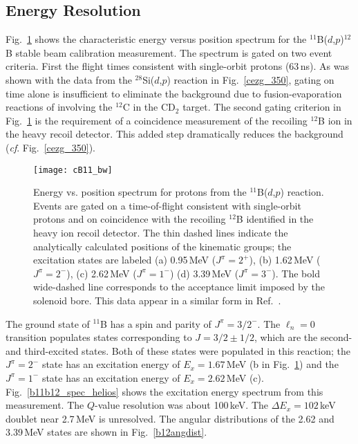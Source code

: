 \subsection{Energy Resolution}
Fig.~\ref{b11_spec} shows the characteristic energy versus position spectrum for the $^{11}$B($d$,$p$)$^{12}$B stable beam calibration measurement.  The spectrum is gated on two event criteria.  First the flight times consistent with single-orbit protons (63\,ns).  As was shown with the data from the $^{28}$Si($d$,$p$) reaction in Fig.~\ref{cezg_350}, gating on time alone is insufficient to eliminate the background due to fusion-evaporation reactions  of involving the $^{12}$C in the CD$_2$ target.  The second gating criterion in Fig.~\ref{b11_spec} is the requirement of a coincidence measurement of the recoiling $^{12}$B ion in the heavy recoil detector.  This added step dramatically reduces the background (\textit{cf}. Fig.~\ref{cezg_350}).  
\begin{figure}[t]
\centering
\texttt{[image: cB11\_bw]}%
\caption[Energy vs. position spectrum for protons from the $^{11}$B($d$,$p$) reaction]{Energy vs. position spectrum for protons from the $^{11}$B($d$,$p$) reaction.  Events are gated on a time-of-flight consistent with single-orbit protons and on coincidence with the recoiling $^{12}$B identified in the heavy ion recoil detector.  The thin dashed lines indicate the analytically calculated positions of the kinematic groups;  the excitation states are labeled (a) 0.95\,MeV ($J^\pi=2^+$), (b) 1.62\,MeV ($J^\pi=2^-$), (c) 2.62\,MeV ($J^\pi=1^-$) (d) 3.39\,MeV ($J^\pi=3^-$). The bold wide-dashed line corresponds to the acceptance limit imposed by the solenoid bore.  This data appear in a similar form in Ref.~\cite[Fig.~2]{Schiffer_2010}. }%
\label{b11_spec}%
\end{figure}

The ground state of $^{11}$B has a spin and parity of $J^\pi=3/2^-$.  The $\ell_n=0$ transition populates states corresponding to $J=3/2\pm1/2$, which are the second- and third-excited states.  Both of these states were populated in this reaction; the $J^\pi=2^-$ state has an excitation energy of $E_x=1.67$\,MeV (b in Fig.~\ref{b11_spec}) and the $J^\pi=1^-$ state has an excitation energy of $E_x=2.62$\,MeV (c).  Fig.~\ref{b11b12_spec_helios} shows the excitation energy spectrum from this measurement. The $Q$-value resolution was about 100\,keV.   The $\Delta E_x=102$\,keV doublet near 2.7\,MeV  is unresolved.  The angular distributions of the 2.62 and 3.39\,MeV states are shown in Fig.~\ref{b12angdist}.  

